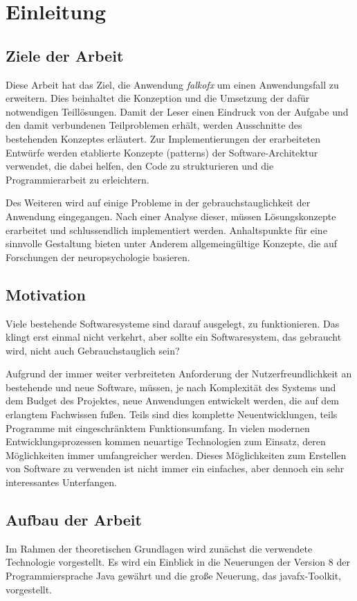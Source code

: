 \chapter{Einleitung}
\section{Ziele der Arbeit} \label{sec:einlZiel}
Diese Arbeit hat das Ziel, die Anwendung \textit{\gls{falkofx}} um einen Anwendungsfall zu erweitern. Dies beinhaltet die Konzeption und die Umsetzung der dafür notwendigen Teillösungen. Damit der Leser einen Eindruck von der Aufgabe und den damit verbundenen Teilproblemen erhält, werden Ausschnitte des bestehenden Konzeptes erläutert. Zur Implementierungen der erarbeiteten Entwürfe werden etablierte Konzepte (\gls{pattern}s) der Software-Architektur verwendet, die dabei helfen, den Code zu strukturieren und die Programmierarbeit zu erleichtern.

Des Weiteren wird auf einige Probleme in der \gls{gebrauchstauglichkeit} der Anwendung eingegangen. Nach einer Analyse dieser, müssen Lösungskonzepte erarbeitet und schlussendlich implementiert werden. Anhaltspunkte für eine sinnvolle Gestaltung bieten unter Anderem allgemeingültige Konzepte, die auf Forschungen der \gls{neuropsychologie} basieren.
\section{Motivation} \label{sec:einlMotivation}
Viele bestehende Softwaresysteme sind darauf ausgelegt, zu funktionieren. Das klingt erst einmal nicht verkehrt, aber sollte ein Softwaresystem, das gebraucht wird, nicht auch Gebrauchstauglich sein?

Aufgrund der immer weiter verbreiteten Anforderung der Nutzerfreundlichkeit an bestehende und neue Software, müssen, je nach Komplexität des Systems und dem Budget des Projektes, neue Anwendungen entwickelt werden, die auf dem erlangtem Fachwissen fußen. Teils sind dies komplette Neuentwicklungen, teils Programme mit eingeschränktem Funktionsumfang. In vielen modernen Entwicklungsprozessen kommen neuartige Technologien zum Einsatz, deren Möglichkeiten immer umfangreicher werden. Dieses Möglichkeiten zum Erstellen von Software zu verwenden ist nicht immer ein einfaches, aber dennoch ein sehr interessantes Unterfangen.
\section{Aufbau der Arbeit} \label{sec:einlAufbau}
Im Rahmen der theoretischen Grundlagen wird zunächst die verwendete Technologie vorgestellt. Es wird ein Einblick in die Neuerungen der Version 8 der Programmiersprache Java gewährt und die große Neuerung, das \gls{javafx}-Toolkit, vorgestellt.


